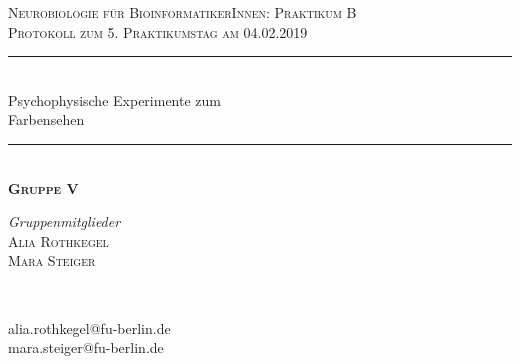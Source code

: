 \documentclass[11pt]{article}
\begin{document}
\begin{titlepage} %
	\newcommand{\HRule}{\rule{\linewidth}{0.5mm}} %
	
	\center %
	\vspace*{0.75cm}

	
	\textsc{\Large Neurobiologie für BioinformatikerInnen: Praktikum B}\\[0.65cm] %
	
	\textsc{\large Protokoll zum 5. Praktikumstag am 04.02.2019}\\[0.65cm] %

	\HRule\\[0.5cm]
	
	{\huge Psychophysische Experimente zum \\[0.2cm]Farbensehen}\\[0.3cm] %
	
	\HRule\\[0.75cm]
	\textsc{\Large\bfseries Gruppe V}
	\\[0.8cm]
	
\vfill

	\begin{minipage}{0.45\textwidth}
		\begin{flushleft}
			\large
			\textit{Gruppenmitglieder}\\
			\textsc{Alia Rothkegel}\\
			\textsc{Mara Steiger}
		\end{flushleft}
	\end{minipage}
	~
	\begin{minipage}{0.45\textwidth}
		\begin{flushright}
			\large \vspace{16pt}
			alia.rothkegel@fu-berlin.de\\
			mara.steiger@fu-berlin.de 
		\end{flushright}
	\end{minipage}
	
\vfill


\end{titlepage}
\end{document}
